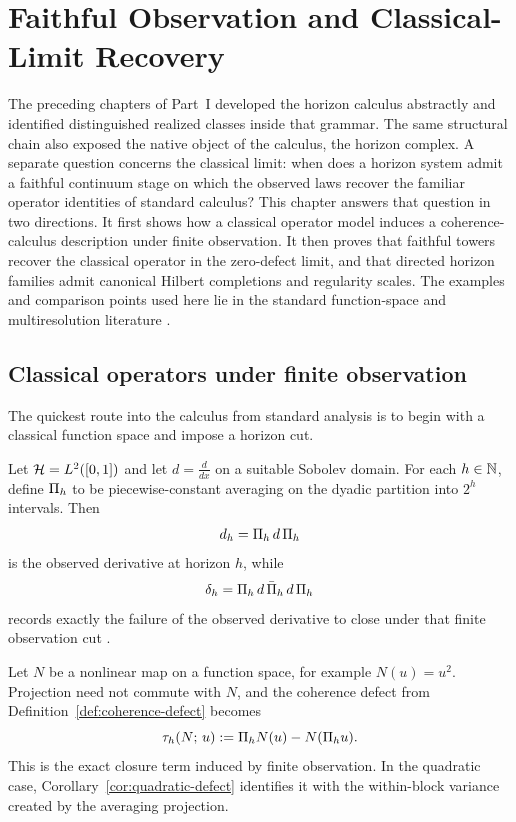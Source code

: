 \section{Faithful Observation and Classical-Limit Recovery}
\label{sec:classical-limit}

The preceding chapters of Part~I developed the horizon calculus abstractly and
identified distinguished realized classes inside that grammar. The same
structural chain also exposed the native object of the calculus, the horizon
complex. A separate
question concerns the classical limit: when does a horizon system admit a
faithful continuum stage on which the observed laws recover the familiar
operator identities of standard calculus? This chapter answers that question in
two directions. It first shows how a classical operator model
induces a coherence-calculus description under finite observation. It then
proves that faithful towers recover the classical operator in the zero-defect
limit, and that directed horizon families admit canonical Hilbert completions
and regularity scales. The examples and comparison points used here lie in the
standard function-space and multiresolution literature
\cite{ReedSimon1972,AdamsFournier2003,Mallat1989,Daubechies1992}.

\subsection{Classical operators under finite observation}

The quickest route into the calculus from standard analysis is to begin with a
classical function space and impose a horizon cut.

\begin{example}
\label{ex:classical-derivative-subsampling}
Let $\cH=L^2([0,1])$ and let $d=\frac{d}{dx}$ on a suitable Sobolev domain.
For each $h\in\bbN$, define $\CCPi{h}$ to be piecewise-constant averaging on
the dyadic partition into $2^h$ intervals. Then
\[
\CCObs{d}{h}=\CCRestr{d}{h}
\]
is the observed derivative at horizon $h$, while
\[
\CCDefect{d}{h}=\CCDefectExpr{d}{h}
\]
records exactly the failure of the observed derivative to close under that
finite observation cut \cite{AdamsFournier2003,Folland1999}.
\end{example}

\begin{example}
\label{ex:nonlinear-classical-defect}
Let $N$ be a nonlinear map on a function space, for example
$N(u)=u^2$. Projection need not commute with $N$, and the coherence defect
from Definition~\ref{def:coherence-defect} becomes
\[
\CCTau{h}{N}{u}:=\CCPi{h}N(u)-N(\CCPi{h}u).
\]
This is the exact closure term induced by finite observation. In the quadratic
case, Corollary~\ref{cor:quadratic-defect} identifies it with the within-block
variance created by the averaging projection.
\end{example}

